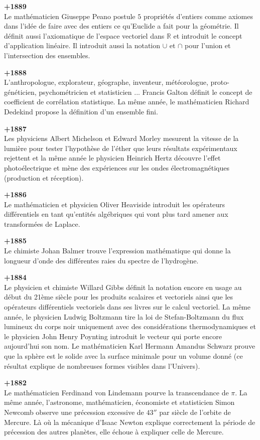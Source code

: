 \textbf{+1889}\\
Le mathématicien Giuseppe Peano postule $5$ propriétés d'entiers comme axiomes dans l'idée de faire avec des entiers ce qu'Euclide a fait pour la géométrie. Il définit aussi l'axiomatique de l'espace vectoriel dans $\mathbb{R}$ et introduit le concept d'application linéaire. Il introduit aussi la notation $\cup$ et $\cap$ pour l'union et l'intersection des ensembles.

\textbf{+1888}\\
L'anthropologue, explorateur, géographe, inventeur, météorologue, proto-généticien, psychométricien et statisticien ... Francis Galton définit le concept de coefficient de corrélation statistique. La même année, le mathématicien Richard Dedekind propose la définition d'un ensemble fini.

\textbf{+1887}\\
Les physiciens Albert Michelson et Edward Morley mesurent la vitesse de la lumière pour tester l'hypothèse de l'éther que leurs résultats expérimentaux rejettent et la même année le physicien Heinrich Hertz découvre l'effet photoélectrique et mène des expériences sur les ondes électromagnétiques (production et réception).

\textbf{+1886}\\
Le mathématicien et physicien Oliver Heaviside introduit les opérateurs différentiels en tant qu'entités algébriques qui vont plus tard amener aux transformées de Laplace.

\textbf{+1885}\\
Le chimiste Johan Balmer trouve l'expression mathématique qui donne la longueur d'onde des différentes raies du spectre de l'hydrogène.

\textbf{+1884}\\
Le physicien et chimiste Willard Gibbs définit la notation encore en usage au début du 21ème siècle pour les produits scalaires et vectoriels ainsi que les opérateurs différentiels vectoriels dans ses livres sur le calcul vectoriel. La même année, le physicien Ludwig Boltzmann tire la loi de  Stefan-Boltzmann du flux lumineux du corps noir uniquement avec des considérations thermodynamiques et le physicien John Henry Poynting introduit le vecteur qui porte encore aujourd'hui son nom. Le mathématicien Karl Hermann Amandus Schwarz prouve que la sphère est le solide avec la surface minimale pour un volume donné (ce résultat explique de nombreuses formes visibles dans l'Univers).

\textbf{+1882}\\
Le mathématicien Ferdinand von Lindemann pourve la transcendance de $\pi $. La même année, l'astronome, mathématicien, économiste et statisticien Simon Newcomb observe une précession excessive de $43''$ par siècle de l'orbite de Mercure. Là où la mécanique d'Isaac Newton explique correctement la période de précession des autres planètes, elle échoue à expliquer celle de Mercure.

